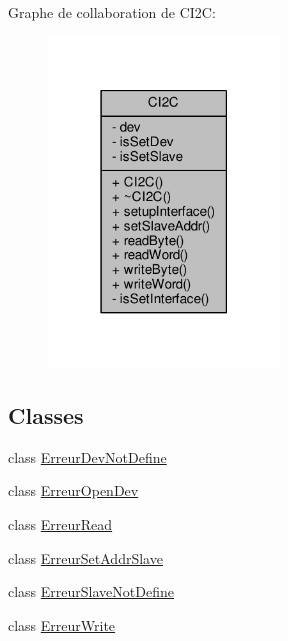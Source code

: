 Graphe de collaboration de C\+I2\+C\+:
\nopagebreak
\begin{figure}[H]
\begin{center}
\leavevmode
\includegraphics[width=174pt]{classCI2C__coll__graph}
\end{center}
\end{figure}
\subsection*{Classes}
\begin{DoxyCompactItemize}
\item 
class \hyperlink{classCI2C_1_1ErreurDevNotDefine}{Erreur\+Dev\+Not\+Define}
\item 
class \hyperlink{classCI2C_1_1ErreurOpenDev}{Erreur\+Open\+Dev}
\item 
class \hyperlink{classCI2C_1_1ErreurRead}{Erreur\+Read}
\item 
class \hyperlink{classCI2C_1_1ErreurSetAddrSlave}{Erreur\+Set\+Addr\+Slave}
\item 
class \hyperlink{classCI2C_1_1ErreurSlaveNotDefine}{Erreur\+Slave\+Not\+Define}
\item 
class \hyperlink{classCI2C_1_1ErreurWrite}{Erreur\+Write}
\end{DoxyCompactItemize}
